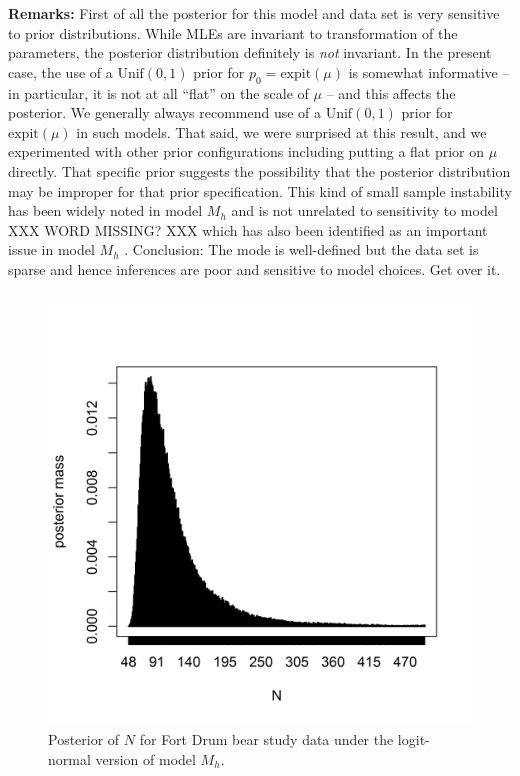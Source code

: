 {\bf Remarks:} First of all the posterior for this model and data set is
very sensitive to prior distributions. While MLEs are invariant to
transformation of the parameters, the posterior distribution
definitely is {\it not} invariant. In the present case, the use of a
$\mbox{Unif}(0,1)$ prior for $p_{0} = \mbox{expit}(\mu)$ is somewhat
informative -- in particular, it is not at all ``flat'' on the scale
of $\mu$ -- and this affects the posterior.  We generally always
recommend use of a $\mbox{Unif}(0,1)$ prior for $\mbox{expit}(\mu)$ in such
models. That said, we were surprised at this result, and we
experimented with other prior configurations including putting a flat
prior on $\mu$ directly. That specific prior suggests the possibility
that the posterior distribution may be improper for that prior
specification. This kind of small sample instability has been widely
noted in model $M_h$ \citep{fienberg_etal:1999, dorazio_royle:2003} and
is not unrelated to sensitivity to
model XXX WORD MISSING? XXX which has also been identified as an important issue in model
$M_{h}$ \citep{dorazio_royle:2003,link:2003}.
Conclusion: The mode is well-defined but the data set is sparse and
hence inferences are poor and sensitive to model choices. Get over it.


\begin{figure}
\centering
\includegraphics[height=4.5in,width=4.5in]{Ch3/figs/bear-modelMh-post}
\caption{Posterior of $N$ for Fort Drum bear study data under the
logit-normal version of model $M_h$. 
}
\label{closed.fig.bearMh}
\end{figure}



